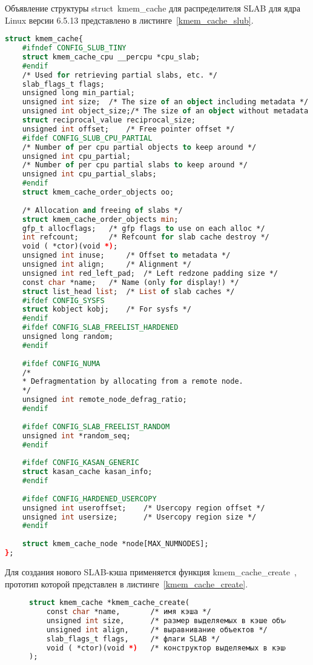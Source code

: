 Объявление структуры struct~kmem\_cache для распределителя SLAB для ядра Linux версии 6.5.13 представлено в листинге~\ref{kmem_cache_slub}.
	\begin{lstlisting}[label=kmem_cache_slub,caption=Объявление структуры struct~kmem\_cache для распределителя SLUB (версия ядра Linux~--- 6.5.13),language=Caml]
struct kmem_cache{
	#ifndef CONFIG_SLUB_TINY
	struct kmem_cache_cpu __percpu *cpu_slab;
	#endif
	/* Used for retrieving partial slabs, etc. */
	slab_flags_t flags;
	unsigned long min_partial;
	unsigned int size;	/* The size of an object including metadata */
	unsigned int object_size;/* The size of an object without metadata */
	struct reciprocal_value reciprocal_size;
	unsigned int offset;	/* Free pointer offset */
	#ifdef CONFIG_SLUB_CPU_PARTIAL
	/* Number of per cpu partial objects to keep around */
	unsigned int cpu_partial;
	/* Number of per cpu partial slabs to keep around */
	unsigned int cpu_partial_slabs;
	#endif
	struct kmem_cache_order_objects oo;
	
	/* Allocation and freeing of slabs */
	struct kmem_cache_order_objects min;
	gfp_t allocflags;	/* gfp flags to use on each alloc */
	int refcount;		/* Refcount for slab cache destroy */
	void ( *ctor)(void *);
	unsigned int inuse;		/* Offset to metadata */
	unsigned int align;		/* Alignment */
	unsigned int red_left_pad;	/* Left redzone padding size */
	const char *name;	/* Name (only for display!) */
	struct list_head list;	/* List of slab caches */
	#ifdef CONFIG_SYSFS
	struct kobject kobj;	/* For sysfs */
	#endif
	#ifdef CONFIG_SLAB_FREELIST_HARDENED
	unsigned long random;
	#endif
	
	#ifdef CONFIG_NUMA
	/*
	* Defragmentation by allocating from a remote node.
	*/
	unsigned int remote_node_defrag_ratio;
	#endif
	
	#ifdef CONFIG_SLAB_FREELIST_RANDOM
	unsigned int *random_seq;
	#endif
	
	#ifdef CONFIG_KASAN_GENERIC
	struct kasan_cache kasan_info;
	#endif
	
	#ifdef CONFIG_HARDENED_USERCOPY
	unsigned int useroffset;	/* Usercopy region offset */
	unsigned int usersize;		/* Usercopy region size */
	#endif
	
	struct kmem_cache_node *node[MAX_NUMNODES];
};
	\end{lstlisting}

Для создания нового SLAB-кэша применяется функция kmem\_cache\_create~\cite{slab_info}, прототип которой представлен в листинге~\ref{kmem_cache_create}.
\begin{figure}[H]
	\begin{lstlisting}[label=kmem_cache_create,caption=Прототип функции kmem\_cache\_create (версия ядра Linux~--- 6.5.13),language=Caml]
struct kmem_cache *kmem_cache_create(
	const char *name,       /* имя кэша */
	unsigned int size,      /* размер выделяемых в кэше объектов */
	unsigned int align,     /* выравнивание объектов */
	slab_flags_t flags,     /* флаги SLAB */
	void ( *ctor)(void *)   /* конструктор выделяемых в кэше объектов */
);
	\end{lstlisting}
\end{figure}

